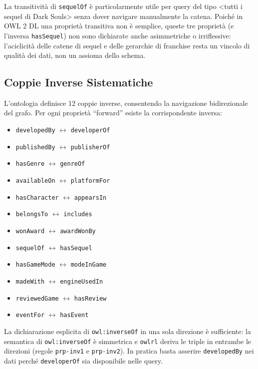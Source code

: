 La transitivit\`a di \texttt{sequelOf} \`e particolarmente utile per query del
tipo \textless{}tutti i sequel di Dark Souls\textgreater{} senza dover navigare
manualmente la catena. Poich\'e in OWL 2 DL una propriet\`a transitiva non \`e semplice,
queste tre propriet\`a (e l'inversa \texttt{hasSequel}) non sono dichiarate anche
asimmetriche o irriflessive: l'aciclicit\`a delle catene di sequel e delle gerarchie
di franchise resta un vincolo di qualit\`a dei dati, non un assioma dello schema.

\subsection{Coppie Inverse Sistematiche}

L'ontologia definisce 12 coppie inverse, consentendo la navigazione bidirezionale
del grafo. Per ogni propriet\`a ``forward'' esiste la corrispondente inversa:
\begin{itemize}[nosep]
  \item \texttt{developedBy} $\leftrightarrow$ \texttt{developerOf}
  \item \texttt{publishedBy} $\leftrightarrow$ \texttt{publisherOf}
  \item \texttt{hasGenre} $\leftrightarrow$ \texttt{genreOf}
  \item \texttt{availableOn} $\leftrightarrow$ \texttt{platformFor}
  \item \texttt{hasCharacter} $\leftrightarrow$ \texttt{appearsIn}
  \item \texttt{belongsTo} $\leftrightarrow$ \texttt{includes}
  \item \texttt{wonAward} $\leftrightarrow$ \texttt{awardWonBy}
  \item \texttt{sequelOf} $\leftrightarrow$ \texttt{hasSequel}
  \item \texttt{hasGameMode} $\leftrightarrow$ \texttt{modeInGame}
  \item \texttt{madeWith} $\leftrightarrow$ \texttt{engineUsedIn}
  \item \texttt{reviewedGame} $\leftrightarrow$ \texttt{hasReview}
  \item \texttt{eventFor} $\leftrightarrow$ \texttt{hasEvent}
\end{itemize}

La dichiarazione esplicita di \texttt{owl:inverseOf}
in una sola direzione \`e sufficiente: la semantica di \texttt{owl:inverseOf} \`e
simmetrica e \texttt{owlrl} deriva le triple in entrambe le direzioni (regole
\texttt{prp-inv1} e \texttt{prp-inv2}). In pratica basta asserire \texttt{developedBy}
nei dati perch\'e \texttt{developerOf} sia disponibile nelle query.

